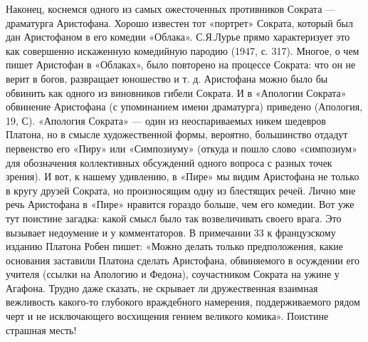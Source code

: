 Наконец, коснемся одного из самых ожесточенных противников Сократа ---
драматурга Аристофана. Хорошо известен тот «портрет» Сократа, который
был дан Аристофаном в его комедии «Облака». С.Я.Лурье прямо
характеризует это как совершенно искаженную комедийную пародию (1947,
с. 317). Многое, о чем пишет Аристофан в «Облаках», было повторено на
процессе Сократа: что он не верит в богов, развращает юношество и т.
д. Аристофана можно было бы обвинить как одного из виновников гибели
Сократа. И в «Апологии Сократа» обвинение Аристофана (с упоминанием
имени драматурга) приведено (Апология, 19, С). «Апология Сократа» ---
один из неоспариваемых никем шедевров Платона, но в смысле
художественной формы, вероятно, большинство отдадут первенство его
«Пиру» или «Симпозиуму» (откуда и пошло слово «симпозиум» для
обозначения коллективных обсуждений одного вопроса с разных точек
зрения). И вот, к нашему удивлению, в «Пире» мы видим Аристофана не
только в кругу друзей Сократа, но произносящим одну из блестящих
речей. Лично мне речь Аристофана в «Пире» нравится гораздо больше, чем
его комедии. Вот уже тут поистине загадка: какой смысл было так
возвеличивать своего врага. Это вызывает недоумение и у комментаторов.
В примечании 33 к французскому изданию Платона Робен пишет: «Можно
делать только предположения, какие основания заставили Платона сделать
Аристофана, обвиняемого в осуждении его учителя (ссылки на Апологию и
Федона), соучастником Сократа на ужине у Агафона. Трудно даже сказать,
не скрывает ли дружественная взаимная вежливость какого-то глубокого
враждебного намерения, поддерживаемого рядом черт и не исключающего
восхищения гением великого комика». Поистине страшная месть!

